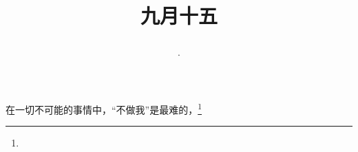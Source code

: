 \title{\date[d=17,m=10,y=2024][year:cn-y,年,month:cn,day:cn,日,·,weekday]·九月十五 }
在一切不可能的事情中，“不做我”是最难的，\footnote{ }

